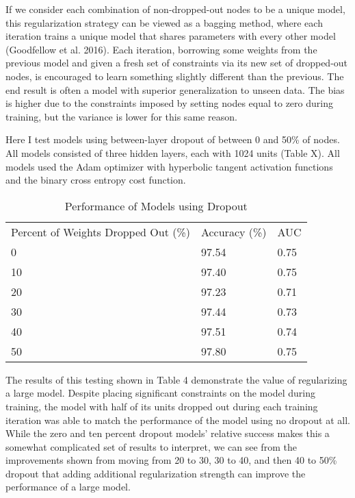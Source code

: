 \documentclass[12pt]{article}  %
\theoremstyle{definition}
\theoremstyle{remark}
\begin{document}
\par If we consider each combination of non-dropped-out nodes to be a unique model, this regularization strategy can be viewed as a bagging method, where each iteration trains a unique model that shares parameters with every other model (Goodfellow et al. 2016). Each iteration, borrowing some weights from the previous model and given a fresh set of constraints via its new set of dropped-out nodes, is encouraged to learn something slightly different than the previous. The end result is often a model with superior generalization to unseen data. The bias is higher due to the constraints imposed by setting nodes equal to zero during training, but the variance is lower for this same reason. 

\par Here I test models using between-layer dropout of between 0 and 50\% of nodes. All models consisted of three hidden layers, each with 1024 units (Table X). All models used the Adam optimizer with hyperbolic tangent activation functions and the binary cross entropy cost function.

\begin{table}[!h]
\centering
\caption{Performance of Models using Dropout}
\label{my-label}
\begin{tabular}{lll}
Percent of Weights Dropped Out (\%) & Accuracy (\%) & AUC  \\
0                          & 97.54         & 0.75 \\
10                         & 97.40         & 0.75 \\
20                         & 97.23         & 0.71 \\
30                         & 97.44         & 0.73 \\
40                         & 97.51         & 0.74 \\
50                         & 97.80         & 0.75
\end{tabular}
\end{table}


\par The results of this testing shown in Table 4 demonstrate the value of regularizing a large model. Despite placing significant constraints on the model during training, the model with half of its units dropped out during each training iteration was able to match the performance of the model using no dropout at all. While the zero and ten percent dropout models' relative success makes this a somewhat complicated set of results to interpret, we can see from the improvements shown from moving from 20 to 30, 30 to 40, and then 40 to 50\% dropout that adding additional regularization strength can improve the performance of a large model. 
\end{document}
